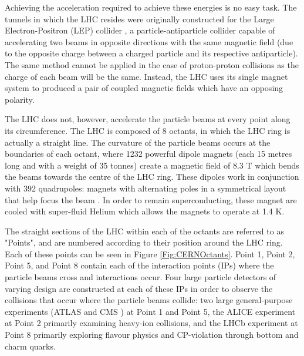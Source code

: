 \documentclass[12pt,a4paper,epsf,portrait,times,epsfig]{article}
\begin{document}
		Achieving the acceleration required to achieve these energies is no easy task. The tunnels in which the LHC resides were originally constructed for the Large Electron-Positron (LEP) collider \cite{LEPHistory, LEPDesign1, LEPDesign2, LEPDesign3}, a particle-antiparticle collider capable of accelerating two beams in opposite directions with the same magnetic field (due to the opposite charge between a charged particle and its respective antiparticle). The same method cannot be applied in the case of proton-proton collisions as the charge of each beam will be the same. Instead, the LHC uses its single magnet system to produced a pair of coupled magnetic fields which have an opposing polarity. \par

		The LHC does not, however, accelerate the particle beams at every point along its circumference. The LHC is composed of 8 octants, in which the LHC ring is actually a straight line. The curvature of the particle beams occurs at the boundaries of each octant, where 1232 powerful dipole magnets (each 15 metres long and with a weight of 35 tonnes) create a magnetic field of 8.3 T which bends the beams towards the centre of the LHC ring. These dipoles work in conjunction with 392 quadrupoles: magnets with alternating poles in a symmetrical layout that help focus the beam \cite{LHCMagnets}. In order to remain superconducting, these magnet are cooled with super-fluid Helium which allows the magnets to operate at 1.4 K. \par

		The straight sections of the LHC within each of the octants are referred to as "Points", and are numbered according to their position around the LHC ring. Each of these points can be seen in Figure \ref{Fig:CERNOctants}. Point 1, Point 2, Point 5, and Point 8 contain each of the interaction points (IPs) where the particle beams cross and interactions occur. Four large particle detectors of varying design are constructed at each of these IPs in order to observe the collisions that occur where the particle beams collide: two large general-purpose experiments (ATLAS \cite{ATLAS_Collab} and CMS \cite{CMSCollab}) at Point 1 and Point 5, the ALICE \cite{ALICECollab} experiment at Point 2 primarily examining heavy-ion collisions, and the LHCb \cite{LHCCollab} experiment at Point 8 primarily exploring flavour physics and CP-violation through bottom and charm quarks. \par
\end{document}
